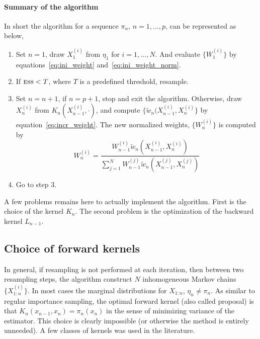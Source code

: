 \paragraph{Summary of the algorithm} In short the algorithm for a sequence
$\pi_n$, $n = 1,\dots,p$, can be represented as below,
\parencite{DelMoral2006}
\begin{enumerate}
  \item Set $n=1$, draw $X_1^{(i)}$ from $\eta_1$ for $i = 1,\dots,N$.  And
    evaluate $\{W_1^{(i)}\}$ by equations~\eqref{eq:ini_weight}
    and~\eqref{eq:ini_weight_norm}.
  \item If $\text{\textsc{ess}} < T$, where $T$ is a predefined threshold, resample.
  \item Set $n = n + 1$, if $n = p + 1$, stop and exit the algorithm.
    Otherwise, draw $X_n^{(i)}$ from $K_n(X_{n-1}^{(i)},\cdot)$, and compute
    $\{\tilde{w}_n(X_{n-1}^{(i)},
      X_n^{(i)}\}$ by equation~\eqref{eq:incr_weight}. The new normalized
    weights, $\{W_n^{(i)}\}$ is computed by
    \begin{equation}
      W_n^{(i)} = \frac{W_{n-1}^{(i)}\tilde{w}_n(X_{n-1}^{(i)},X_n^{(i)})}
      {\sum_{j=1}^NW_{n-1}^{(j)}\tilde{w}_n(X_{n-1}^{(j)},X_n^{(j)})}
    \end{equation}
  \item Go to step 3.
\end{enumerate}

A few problems remains here to actually implement the algorithm. First is
the choice of the kernel $K_n$.  The second problem is the optimization of
the backward kernel $L_{n-1}$.

\subsection{Choice of forward kernels}
\label{sub:Choice of forward kernels}

In general, if resampling is not performed at each iteration, then between two
resampling steps, the \smc algorithm construct $N$ inhomogeneous Markov chains
$\{X_{1:n}^{(i)}\}$. In most cases the marginal distributions for $X_{1:n}$,
$\eta_n \ne \pi_n$. As similar to regular importance sampling, the optimal
forward kernel (also called proposal) is that $K_n(x_{n-1},x_n) = \pi_n(x_n)$
in the sense of minimizing variance of the estimator. This choice is clearly
impossible (or otherwise the \smc method is entirely unneeded). A few classes
of kernels was used in the literature.

